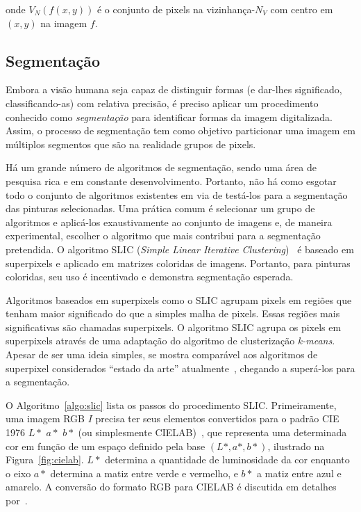 \noindent onde $V_N(f(x,y))$ é o conjunto de pixels na
vizinhança-$N_V$ com centro em $(x,y)$ na imagem $f$.

\subsection{Segmentação}
\label{sec:slic}

Embora a visão humana seja capaz de distinguir formas (e dar-lhes
significado, classificando-as) com relativa precisão, é preciso
aplicar um procedimento conhecido como \emph{segmentação} para
identificar formas da imagem digitalizada. Assim, o processo de
segmentação tem como objetivo particionar uma imagem em múltiplos
segmentos que são na realidade grupos de pixels.

Há um grande número de algoritmos de segmentação, sendo uma área de
pesquisa rica e em constante desenvolvimento. Portanto, não há como
esgotar todo o conjunto de algoritmos existentes em via de testá-los
para a segmentação das pinturas selecionadas. Uma prática comum é
selecionar um grupo de algoritmos e aplicá-los exaustivamente ao
conjunto de imagens e, de maneira experimental, escolher o algoritmo
que mais contribui para a segmentação pretendida. O algoritmo SLIC
(\textit{Simple Linear Iterative Clustering})~\cite{slic} é baseado em
superpixels e aplicado em matrizes coloridas de imagens. Portanto,
para pinturas coloridas, seu uso é incentivado e demonstra segmentação
esperada.

Algoritmos baseados em superpixels como o SLIC agrupam pixels em
regiões que tenham maior significado do que a simples malha de
pixels. Essas regiões mais significativas são chamadas superpixels. O
algoritmo SLIC agrupa os pixels em superpixels através de uma
adaptação do algoritmo de clusterização \emph{k-means}. Apesar de ser
uma ideia simples, se mostra comparável aos algoritmos de superpixel
considerados ``estado da arte'' atualmente~\cite{slic}, chegando a
superá-los para a segmentação.

O Algoritmo~\ref{algo:slic} lista os passos do procedimento
SLIC. Primeiramente, uma imagem RGB $I$ precisa ter seus elementos
convertidos para o padrão CIE 1976 $L*$ $a*$ $b*$ (ou simplesmente
CIELAB)~\cite{cielab1}, que representa uma determinada cor em função
de um espaço definido pela base $(L*, a*, b*)$, ilustrado na
Figura~\ref{fig:cielab}. $L*$ determina a quantidade de luminosidade
da cor enquanto o eixo $a*$ determina a matiz entre verde e vermelho,
e $b*$ a matiz entre azul e amarelo. A conversão do formato RGB para
CIELAB é discutida em detalhes por~\citeauthor{cielab2}.

